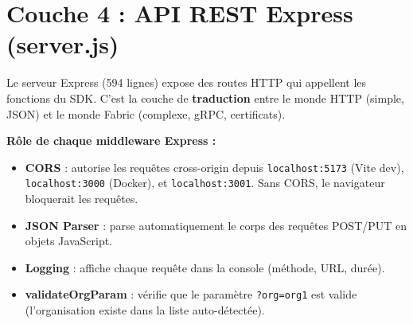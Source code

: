 \documentclass[12pt,a4paper,twoside]{report}
\begin{document}
\section{Couche 4 : API REST Express (server.js)}

Le serveur Express (594 lignes) expose des routes HTTP qui appellent les fonctions du SDK. C'est la couche de \textbf{traduction} entre le monde HTTP (simple, JSON) et le monde Fabric (complexe, gRPC, certificats).

\textbf{Rôle de chaque middleware Express :}
\begin{itemize}
    \item \textbf{CORS} : autorise les requêtes cross-origin depuis \texttt{localhost:5173} (Vite dev), \texttt{localhost:3000} (Docker), et \texttt{localhost:3001}. Sans CORS, le navigateur bloquerait les requêtes.
    \item \textbf{JSON Parser} : parse automatiquement le corps des requêtes POST/PUT en objets JavaScript.
    \item \textbf{Logging} : affiche chaque requête dans la console (méthode, URL, durée).
    \item \textbf{validateOrgParam} : vérifie que le paramètre \texttt{?org=org1} est valide (l'organisation existe dans la liste auto-détectée).
\end{itemize}
\end{document}
